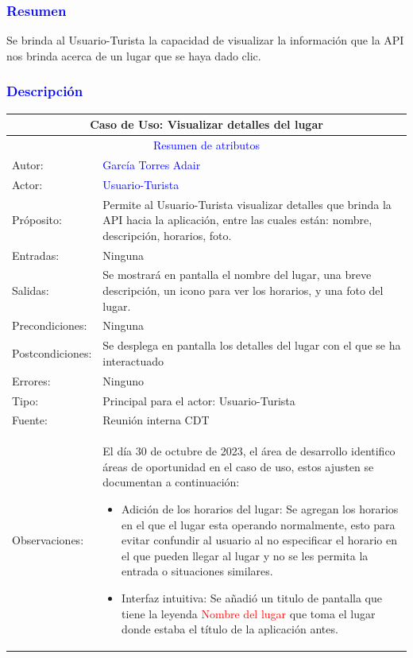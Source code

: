 \subsubsection{\textcolor{blue}{Resumen}}{
Se brinda al Usuario-Turista la capacidad de visualizar la información que la API nos brinda acerca de un lugar que se haya dado clic.
}

\subsubsection{\textcolor{blue}{Descripción}}
\begin{tabularx}{16cm}{||l|X||}
	\hline
	\multicolumn{2}{||c||}{Caso de Uso: Visualizar detalles del lugar} \\
	\hline
	\multicolumn{2}{||c||}{\textcolor{blue}{Resumen de atributos}} \\
        \hline
	{Autor:} & {\textcolor{blue}{García Torres Adair}} \\
	\hline
	{Actor:} & {\textcolor{blue}{Usuario-Turista}} \\
	\hline
	{Próposito:} & {
            Permite al Usuario-Turista visualizar detalles que brinda la API hacia la aplicación, entre las cuales están: nombre, descripción, horarios, foto.
 
    } \\
	\hline
	{Entradas:} & {Ninguna}\\
	\hline
	{Salidas:} & {Se mostrará en pantalla el nombre del lugar, una breve descripción, un icono para ver los horarios, y una foto del lugar.}\\
	\hline
	{Precondiciones:} & {Ninguna}\\ 
	\hline
	{Postcondiciones:} & {Se desplega en pantalla los detalles del lugar con el que se ha interactuado}\\
	\hline
	{Errores:} & {Ninguno} \\
	\hline
	{Tipo:} & {Principal para el actor: Usuario-Turista}\\
	\hline
	{Fuente:} & {Reunión interna CDT} \\
	\hline
	
    Observaciones: & El día 30 de octubre de 2023, el área de desarrollo identifico áreas de oportunidad en el caso de uso, estos ajusten se documentan a continuación:
                \begin{itemize}
                    \item {
                   Adición de los horarios del lugar: Se agregan los horarios en el que el lugar esta operando normalmente, esto para evitar confundir al usuario al no especificar el horario en el que pueden llegar al lugar y no se les permita la entrada o situaciones similares.
                    }
                    \item {
                    Interfaz intuitiva: Se añadió un titulo de pantalla que tiene la leyenda \textcolor{red}{Nombre del lugar} que toma el lugar donde estaba el título de la aplicación antes.
                    }
                \end{itemize}


 
     \\
	\hline
\end{tabularx}

